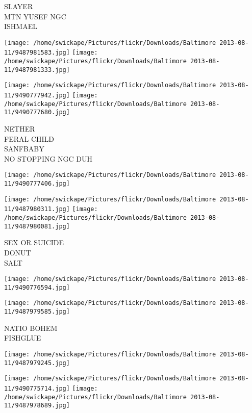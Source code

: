 \documentclass[10pt,letterpaper]{article}
\begin{document}
SLAYER\\
MTN YUSEF NGC\\
ISHMAEL\\
\pagebreak

\texttt{[image: /home/swickape/Pictures/flickr/Downloads/Baltimore 2013-08-11/9487981583.jpg]}
\texttt{[image: /home/swickape/Pictures/flickr/Downloads/Baltimore 2013-08-11/9487981333.jpg]}

\texttt{[image: /home/swickape/Pictures/flickr/Downloads/Baltimore 2013-08-11/9490777942.jpg]}
\texttt{[image: /home/swickape/Pictures/flickr/Downloads/Baltimore 2013-08-11/9490777680.jpg]}

NETHER\\
FERAL CHILD\\
SANFBABY\\
NO STOPPING NGC DUH\\
\pagebreak

\texttt{[image: /home/swickape/Pictures/flickr/Downloads/Baltimore 2013-08-11/9490777406.jpg]}

\vspace{0.25in}
\texttt{[image: /home/swickape/Pictures/flickr/Downloads/Baltimore 2013-08-11/9487980311.jpg]}
\texttt{[image: /home/swickape/Pictures/flickr/Downloads/Baltimore 2013-08-11/9487980081.jpg]}

SEX OR SUICIDE\\
DONUT\\
SALT\\
\pagebreak

\texttt{[image: /home/swickape/Pictures/flickr/Downloads/Baltimore 2013-08-11/9490776594.jpg]}

\vspace{0.25in}
\texttt{[image: /home/swickape/Pictures/flickr/Downloads/Baltimore 2013-08-11/9487979585.jpg]}

NATIO BOHEM\\
FISHGLUE\\
\pagebreak

\texttt{[image: /home/swickape/Pictures/flickr/Downloads/Baltimore 2013-08-11/9487979245.jpg]}

\vspace{0.25in}
\texttt{[image: /home/swickape/Pictures/flickr/Downloads/Baltimore 2013-08-11/9490775714.jpg]}
\texttt{[image: /home/swickape/Pictures/flickr/Downloads/Baltimore 2013-08-11/9487978689.jpg]}
\end{document}
